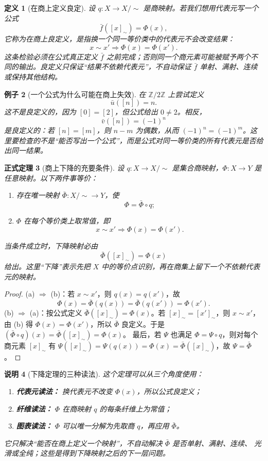 \documentclass[UTF8,fontset=none,a4paper,11pt]{ctexart}
\theoremstyle{foundation-definition}
\newtheorem{definition}{定义}[section]
\theoremstyle{foundation-theorem}
\newtheorem{theorem}[definition]{正式定理}
\theoremstyle{foundation-proposition}
\theoremstyle{foundation-example}
\newtheorem{example}[definition]{例子}
\theoremstyle{foundation-remark}
\newtheorem{remark}[definition]{说明}
\theoremstyle{foundation-theorem}
\begin{document}
\begin{definition}[在商上定义良定]\label{def:well-defined-quotient}
设 \(q:X\to X/{\sim}\) 是商映射。若我们想用代表元写一个公式
\[
\bar f([x]_{\sim})=\Phi(x),
\]
它称为在商上\emph{良定义}，是指换一个同一等价类中的代表元不会改变结果：
\[
x\sim x'\Longrightarrow \Phi(x)=\Phi(x').
\]
这条检验必须在公式真正定义 \(\bar f\) 之前完成；否则同一个商元素可能被赋予两个不同的输出。良定义只保证“结果不依赖代表元”，不自动保证 \(\bar f\) 单射、满射、连续或保持其他结构。
\end{definition}

\begin{example}[一个公式为什么可能在商上失效]
在 \(\mathbb Z/2\mathbb Z\) 上尝试定义
\[
\bar u([n])=n.
\]
这不是良定义的，因为 \([0]=[2]\)，但公式给出 \(0\ne2\)。相反，
\[
\bar v([n])=(-1)^n
\]
是良定义的：若 \([n]=[m]\)，则 \(n-m\) 为偶数，从而
\((-1)^n=(-1)^m\)。这里要检查的不是“能否写出一个公式”，而是公式对同一等价类的所有代表元是否给出同一结果。
\end{example}

\begin{theorem}[商上下降的充要条件]\label{thm:quotient-descent-iff}
设 \(q:X\to X/{\sim}\) 是集合商映射，\(\Phi:X\to Y\) 是任意映射。以下两件事等价：
\begin{enumerate}[label=(\alph*)]
  \item 存在唯一映射 \(\bar\Phi:X/{\sim}\to Y\)，使
  \[
  \Phi=\bar\Phi\circ q;
  \]
  \item \(\Phi\) 在每个等价类上取常值，即
  \[
  x\sim x'\Longrightarrow\Phi(x)=\Phi(x').
  \]
\end{enumerate}
当条件成立时，下降映射必由
\[
\bar\Phi([x]_{\sim})=\Phi(x)
\]
给出。这里“下降”表示先把 \(X\) 中的等价点识别，再在商集上留下一个不依赖代表元的映射。
\end{theorem}

\begin{proof}
(a) \(\Rightarrow\) (b)：若 \(x\sim x'\)，则 \(q(x)=q(x')\)，故
\[
\Phi(x)=\bar\Phi(q(x))=\bar\Phi(q(x'))=\Phi(x').
\]
(b) \(\Rightarrow\) (a)：按公式定义 \(\bar\Phi([x]_\sim)=\Phi(x)\)。若
\([x]_\sim=[x']_\sim\)，则 \(x\sim x'\)，由 (b) 得 \(\Phi(x)=\Phi(x')\)，所以
\(\bar\Phi\) 良定义。于是 \((\bar\Phi\circ q)(x)=\bar\Phi([x]_\sim)=\Phi(x)\)。
最后，若 \(\Psi\) 也满足 \(\Phi=\Psi\circ q\)，则对每个商元素 \([x]_\sim\) 有
\(\Psi([x]_\sim)=\Psi(q(x))=\Phi(x)=\bar\Phi([x]_\sim)\)，故 \(\Psi=\bar\Phi\)。
\end{proof}

\begin{remark}[下降定理的三种读法]
这个定理可以从三个角度使用：
\begin{enumerate}[label=(\arabic*)]
  \item \textbf{代表元读法：} 换代表元不改变 \(\Phi(x)\)，所以公式良定义；
  \item \textbf{纤维读法：} \(\Phi\) 在商映射 \(q\) 的每条纤维上为常值；
  \item \textbf{图表读法：} \(\Phi\) 可以唯一分解为先取商 \(q\)，再应用 \(\bar\Phi\)。
\end{enumerate}
它只解决“能否在商上定义一个映射”，不自动解决 \(\bar\Phi\) 是否单射、满射、连续、
光滑或全纯；这些是得到下降映射之后的下一层问题。
\end{remark}
\end{document}
